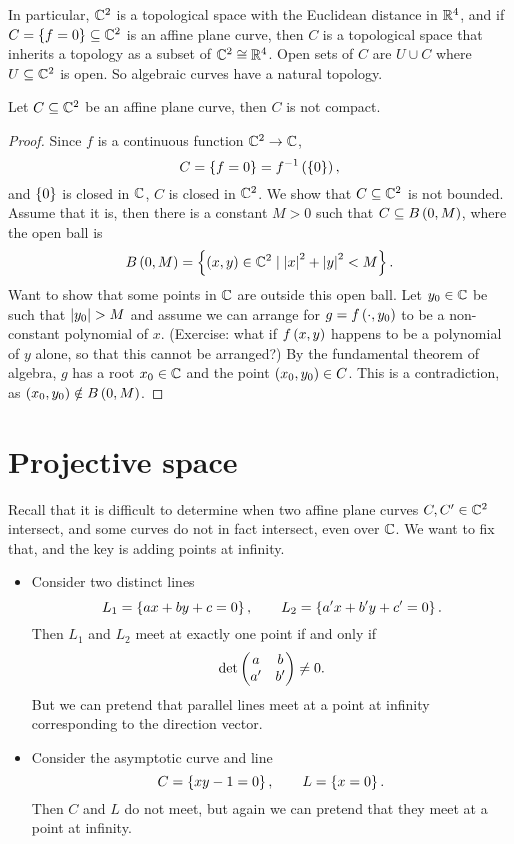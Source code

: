 In particular, $ \mathbb{C}^2 $ is a topological space with the Euclidean distance in $ \mathbb{R}^4 $, and if $ C = \left\{ f = 0 \right\} \subseteq \mathbb{C}^2 $ is an affine plane curve, then $ C $ is a topological space that inherits a topology as a subset of $ \mathbb{C}^2 \cong \mathbb{R}^4 $. Open sets of $ C $ are $ U \cup C $ where $ U \subseteq \mathbb{C}^2 $ is open. So algebraic curves have a natural topology.

\begin{lemma}
Let $ C \subseteq \mathbb{C}^2 $ be an affine plane curve, then $ C $ is not compact.
\end{lemma}

\begin{proof}
Since $ f $ is a continuous function $ \mathbb{C}^2 \to \mathbb{C} $,
$$ C = \left\{ f = 0 \right\} = f^{-1}\left( \left\{ 0 \right\} \right), $$
and $ \left\{ 0 \right\} $ is closed in $ \mathbb{C} $, $ C $ is closed in $ \mathbb{C}^2 $. We show that $ C \subseteq \mathbb{C}^2 $ is not bounded. Assume that it is, then there is a constant $ M > 0 $ such that $ C \subseteq B\left( 0, M \right) $, where the open ball is
$$ B\left( 0, M \right) = \left\{ \left( x, y \right) \in \mathbb{C}^2 \mid \left\lvert x \right\rvert^2 + \left\lvert y \right\rvert^2 < M \right\}. $$
Want to show that some points in $ \mathbb{C} $ are outside this open ball. Let $ y_0 \in \mathbb{C} $ be such that $ \left\lvert y_0 \right\rvert > M $ and assume we can arrange for $ g = f\left( \cdot, y_0 \right) $ to be a non-constant polynomial of $ x $. (Exercise: what if $ f\left( x, y \right) $ happens to be a polynomial of $ y $ alone, so that this cannot be arranged?) By the fundamental theorem of algebra, $ g $ has a root $ x_0 \in \mathbb{C} $ and the point $ \left( x_0, y_0 \right) \in C $. This is a contradiction, as $ \left( x_0, y_0 \right) \notin B\left( 0, M \right) $.
\end{proof}

\pagebreak

\section{Projective space}


Recall that it is difficult to determine when two affine plane curves $ C, C' \in \mathbb{C}^2 $ intersect, and some curves do not in fact intersect, even over $ \mathbb{C} $. We want to fix that, and the key is adding points at infinity.

\begin{example}
\hfill
\begin{itemize}
\item Consider two distinct lines
$$ L_1 = \left\{ ax + by + c = 0 \right\}, \qquad L_2 = \left\{ a'x + b'y + c' = 0 \right\}. $$
Then $ L_1 $ and $ L_2 $ meet at exactly one point if and only if
$$ \det\begin{pmatrix} a & b \\ a' & b' \end{pmatrix} \ne 0. $$
But we can pretend that parallel lines meet at a point at infinity corresponding to the direction vector.
\item Consider the asymptotic curve and line
$$ C = \left\{ xy - 1 = 0 \right\}, \qquad L = \left\{ x = 0 \right\}. $$
Then $ C $ and $ L $ do not meet, but again we can pretend that they meet at a point at infinity.
\end{itemize}
\end{example}


